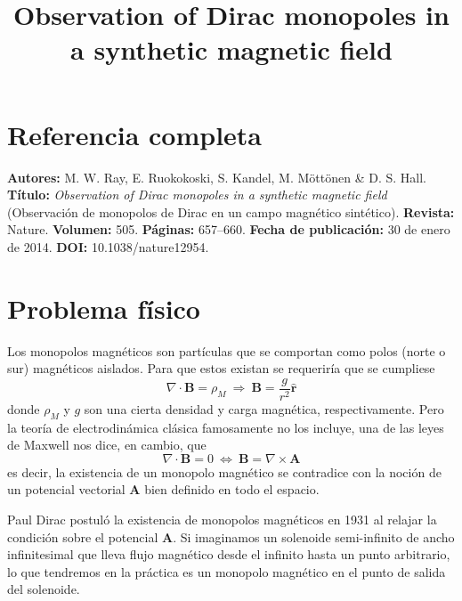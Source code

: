 \documentclass[twocolumn]{article}
\title{\vspace{-1.4cm}Observation of Dirac monopoles in a synthetic magnetic field\vspace{-3mm}}
\author{\vspace{-5mm}}
\date{\vspace{-10mm}}
\numberwithin{equation}{section}
\newcommand{\0}{\textcolor{gray}{0}}
\newcommand{\di}{\nabla\cdot}
\newcommand{\ro}{\nabla\times}
\newcommand{\rv}{\mathbf{r}}
\newcommand{\rhat}{\hat{\rv}}
\newcommand{\n}[1]{\mathbf{#1}}
\begin{document}
	\maketitle
	\section{Referencia completa}
	\textbf{Autores:} M. W. Ray, E. Ruokokoski, S. Kandel, M. Möttönen \& D. S. Hall.
	\textbf{Título:} \textit{Observation of Dirac monopoles in a synthetic magnetic field} (Observación de monopolos de Dirac en un campo magnético sintético).
	\textbf{Revista:} Nature.
	\textbf{Volumen:} 505.
	\textbf{Páginas:} 657–660.
	\textbf{Fecha de publicación:} 30 de enero de 2014.
	\textbf{DOI:} 10.1038/nature12954.
	
	\vspace{-3mm}	
	\section{Problema físico}
	Los monopolos magnéticos son partículas que se comportan como polos (norte o sur) magnéticos aislados. Para que estos existan se requeriría que se cumpliese
	\begin{equation}
		\di\n{B} = \rho_M ~\Rightarrow~ \n{B} = \frac{g}{r^2}\rhat \label{B_rho}
	\end{equation}
	donde $\rho_M$ y $g$ son una cierta densidad y carga magnética, respectivamente. Pero la teoría de electrodinámica clásica famosamente no los incluye, una de las leyes de Maxwell nos dice, en cambio, que
	\begin{equation}
		\di\n{B} = 0 ~\Leftrightarrow~ \n{B} = \ro\n{A} \label{B_0}
	\end{equation}
	es decir, la existencia de un monopolo magnético se contradice con la noción de un potencial vectorial $\n{A}$ bien definido en todo el espacio.
	
	Paul Dirac postuló la existencia de monopolos magnéticos en 1931 al relajar la condición sobre el potencial $\n{A}$. Si imaginamos un solenoide semi-infinito de ancho infinitesimal que lleva flujo  magnético desde el infinito hasta un punto arbitrario, lo que tendremos en la práctica es un monopolo magnético en el punto de salida del solenoide.
	
\end{document}
